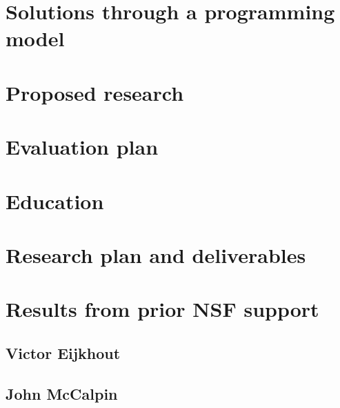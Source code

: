 \section{Solutions through a programming model}
\label{sec:imp}




\section{Proposed research}
\label{sec:proposed}


\section{Evaluation plan}
\label{sec:eval}


\section{Education}
\label{sec:edu}


\section{Research plan and deliverables}
\label{sec:time}


\section{Results from prior NSF support}
\label{sec:prior}
\subsection*{Victor Eijkhout}

\subsection*{John McCalpin}



